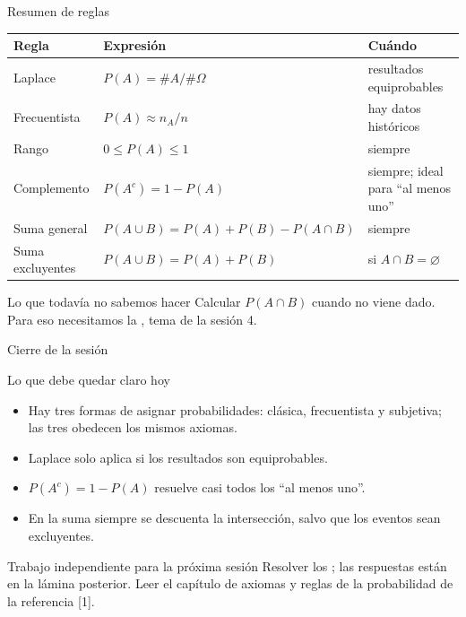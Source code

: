\documentclass[aspectratio=169,10pt]{beamer}
\begin{document}
\begin{frame}{Resumen de reglas}
  \footnotesize
  \begin{center}
  \begin{tabular}{@{}lll@{}}
    \toprule
    \textbf{Regla} & \textbf{Expresión} & \textbf{Cuándo} \\
    \midrule
    Laplace          & $P(A)=\#A/\#\Omega$ & resultados equiprobables \\
    Frecuentista     & $P(A)\approx n_A/n$ & hay datos históricos \\
    Rango            & $0\le P(A)\le 1$ & siempre \\
    Complemento      & $P(A^{c})=1-P(A)$ & siempre; ideal para ``al menos uno'' \\
    Suma general     & $P(A\cup B)=P(A)+P(B)-P(A\cap B)$ & siempre \\
    Suma excluyentes & $P(A\cup B)=P(A)+P(B)$ & si $A\cap B=\varnothing$ \\
    \bottomrule
  \end{tabular}
  \end{center}

  \vspace{0.25cm}
  \begin{alertblock}{Lo que todavía no sabemos hacer}
    \footnotesize
    Calcular $P(A\cap B)$ cuando no viene dado. Para eso necesitamos la
    , tema de la sesión 4.
  \end{alertblock}
\end{frame}

\begin{frame}{Cierre de la sesión}
  \begin{block}{Lo que debe quedar claro hoy}
    \begin{itemize}
      \item Hay tres formas de asignar probabilidades: clásica, frecuentista y
            subjetiva; las tres obedecen los mismos axiomas.
      \item Laplace solo aplica si los resultados son equiprobables.
      \item $P(A^{c})=1-P(A)$ resuelve casi todos los ``al menos uno''.
      \item En la suma siempre se descuenta la intersección, salvo que los
            eventos sean excluyentes.
    \end{itemize}
  \end{block}

  \vspace{0.2cm}
  \begin{alertblock}{Trabajo independiente para la próxima sesión}
    \footnotesize
    Resolver los ; las
    respuestas están en la lámina posterior. Leer el capítulo de axiomas y
    reglas de la probabilidad de la referencia [1].
  \end{alertblock}
\end{frame}
\end{document}
